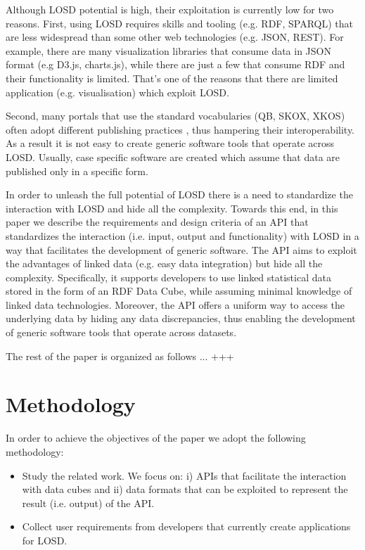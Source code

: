 \documentclass{llncs}
\begin{document}
Although LOSD potential is high, their exploitation is currently low for two reasons. First, using LOSD requires skills and tooling (e.g. RDF, SPARQL) that are less widespread than some other web technologies (e.g. JSON, REST). For example, there are many visualization libraries that consume data in JSON format (e.g D3.js, charts.js), while there are just a few that consume RDF and their functionality is limited. That's one of the reasons that there are limited application (e.g. visualisation) which exploit LOSD.

Second, many portals that use the standard vocabularies (QB, SKOX, XKOS) often adopt different publishing practices \cite{KalampokisChallenges}, thus hampering their interoperability. As a result it is not easy to create generic software tools that operate across LOSD. Usually, case specific software \cite{KaramanouResultsSoFar} are created which assume that data are published only in a specific form. 

In order to unleash the full potential of LOSD there is a need to standardize the interaction with LOSD and hide all the complexity. Towards this end, in this paper we describe the requirements and design criteria of an API that standardizes the interaction (i.e. input, output and functionality) with LOSD in a way that facilitates the development of generic software. The API aims to exploit the advantages of linked data (e.g. easy data integration) but hide all the complexity. Specifically, it supports developers to use linked statistical data stored in the form of an RDF Data Cube, while assuming minimal knowledge of linked data technologies. Moreover, the API offers a uniform way to access the underlying data by hiding any data discrepancies, thus enabling the development of generic software tools that operate across datasets. 

The rest of the paper is organized as follows ... +++

\section{Methodology}\label{sec:methodology}

In order to achieve the objectives of the paper we adopt the following methodology:
\begin{itemize}
\item Study the related work. We focus on: i) APIs that facilitate the interaction with data cubes and ii) data formats that can be exploited to represent the result (i.e. output) of the API. 
\item Collect user requirements from developers that currently create applications for LOSD. 
\end{itemize}
\end{document}
